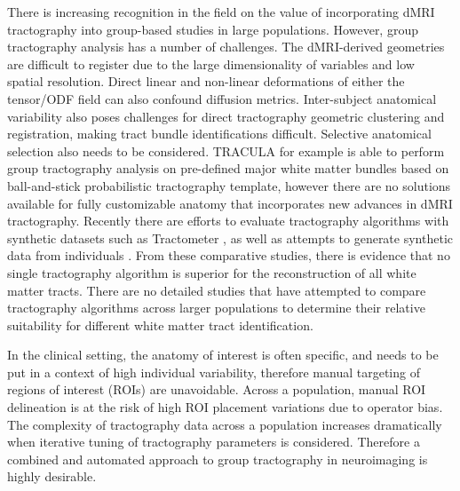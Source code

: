 There is increasing recognition in the field on the value of incorporating dMRI tractography into group-based studies in large populations. However, group tractography analysis has a number of challenges. The dMRI-derived geometries are difficult to register due to the large dimensionality of variables and low spatial resolution. Direct linear and non-linear deformations of either the tensor/ODF field can also confound diffusion metrics. Inter-subject anatomical variability also poses challenges for direct tractography geometric clustering and registration, making tract bundle identifications difficult. Selective anatomical selection also needs to be considered. TRACULA \cite{Yendiki2011} for example is able to perform group tractography analysis on pre-defined major white matter bundles based on ball-and-stick probabilistic tractography template, however there are no solutions available for fully customizable anatomy that incorporates new advances in dMRI tractography. Recently there are efforts to evaluate tractography algorithms with synthetic datasets such as Tractometer \cite{Cote2012,Cote2013}, as well as attempts to generate synthetic data from individuals \cite{Wilkins2015}. From these comparative studies, there is evidence that no single tractography algorithm is superior for the reconstruction of all white matter tracts. There are no detailed studies that have attempted to compare tractography algorithms across larger populations to determine their relative suitability for different white matter tract identification. 

In the clinical setting, the anatomy of interest is often specific, and needs to be put in a context of high individual variability, therefore manual targeting of regions of interest (ROIs) are unavoidable. Across a population, manual ROI delineation is at the risk of high ROI placement variations due to operator bias. The complexity of tractography data across a population increases dramatically when iterative tuning of tractography parameters is considered. Therefore a combined and automated approach to group tractography in neuroimaging is highly desirable. 

